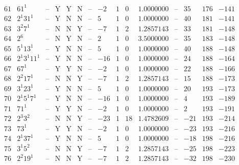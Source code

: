 \documentclass[11pt,reqno,a4letter]{article}
\numberwithin{figure}{section}
\numberwithin{table}{section}
\theoremstyle{plain}
\numberwithin{theorem}{section}
\theoremstyle{definition}
\begin{document}
\begin{table}[h!]
\begin{equation*}
{\begin{array}{|cc|c|ccc|c|c|ccc|c|ccc}
 61 & 61^1 & \text{--} & \text{Y} & \text{Y} & \text{N} & \text{--} & -2 & 1 & 0 & 1.0000000 & \text{--} & 35 & 176 & -141 \\
 62 & 2^1 31^1 & \text{--} & \text{Y} & \text{N} & \text{N} & \text{--} & 5 & 1 & 0 & 1.0000000 & \text{--} & 40 & 181 & -141 \\
 63 & 3^2 7^1 & \text{--} & \text{N} & \text{N} & \text{Y} & \text{--} & -7 & 1 & 2 & 1.2857143 & \text{--} & 33 & 181 & -148 \\
 64 & 2^6 & \text{--} & \text{N} & \text{Y} & \text{N} & \text{--} & 2 & 1 & 0 & 3.5000000 & \text{--} & 35 & 183 & -148 \\
 65 & 5^1 13^1 & \text{--} & \text{Y} & \text{N} & \text{N} & \text{--} & 5 & 1 & 0 & 1.0000000 & \text{--} & 40 & 188 & -148 \\
 66 & 2^1 3^1 11^1 & \text{--} & \text{Y} & \text{N} & \text{N} & \text{--} & -16 & 1 & 0 & 1.0000000 & \text{--} & 24 & 188 & -164 \\
 67 & 67^1 & \text{--} & \text{Y} & \text{Y} & \text{N} & \text{--} & -2 & 1 & 0 & 1.0000000 & \text{--} & 22 & 188 & -166 \\
 68 & 2^2 17^1 & \text{--} & \text{N} & \text{N} & \text{Y} & \text{--} & -7 & 1 & 2 & 1.2857143 & \text{--} & 15 & 188 & -173 \\
 69 & 3^1 23^1 & \text{--} & \text{Y} & \text{N} & \text{N} & \text{--} & 5 & 1 & 0 & 1.0000000 & \text{--} & 20 & 193 & -173 \\
 70 & 2^1 5^1 7^1 & \text{--} & \text{Y} & \text{N} & \text{N} & \text{--} & -16 & 1 & 0 & 1.0000000 & \text{--} & 4 & 193 & -189 \\
 71 & 71^1 & \text{--} & \text{Y} & \text{Y} & \text{N} & \text{--} & -2 & 1 & 0 & 1.0000000 & \text{--} & 2 & 193 & -191 \\
 72 & 2^3 3^2 & \text{--} & \text{N} & \text{N} & \text{Y} & \text{--} & -23 & 1 & 18 & 1.4782609 & \text{--} & -21 & 193 & -214 \\
 73 & 73^1 & \text{--} & \text{Y} & \text{Y} & \text{N} & \text{--} & -2 & 1 & 0 & 1.0000000 & \text{--} & -23 & 193 & -216 \\
 74 & 2^1 37^1 & \text{--} & \text{Y} & \text{N} & \text{N} & \text{--} & 5 & 1 & 0 & 1.0000000 & \text{--} & -18 & 198 & -216 \\
 75 & 3^1 5^2 & \text{--} & \text{N} & \text{N} & \text{Y} & \text{--} & -7 & 1 & 2 & 1.2857143 & \text{--} & -25 & 198 & -223 \\
 76 & 2^2 19^1 & \text{--} & \text{N} & \text{N} & \text{Y} & \text{--} & -7 & 1 & 2 & 1.2857143 & \text{--} & -32 & 198 & -230 \\

\end{array}}
\end{equation*}
\end{table}
\end{document}

